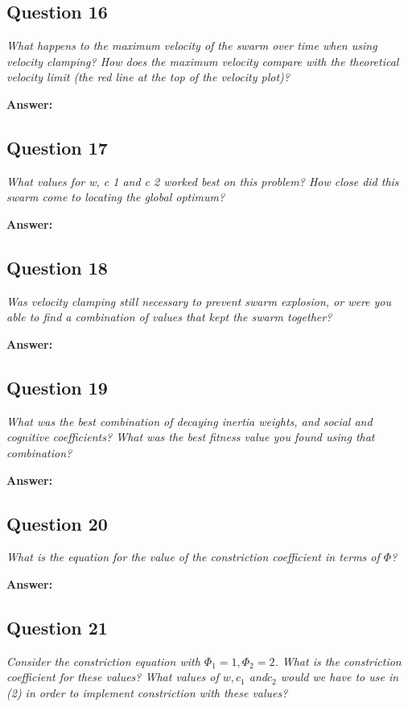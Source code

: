 \documentclass[a4paper]{article}
\begin{document}
\subsection*{Question 16}
\emph{What happens to the maximum velocity of the swarm over time
when using velocity clamping? How does the maximum velocity compare with
the theoretical velocity limit (the red line at the top of the velocity plot)?} 

\textbf{Answer:}

\subsection*{Question 17}
\emph{What values for w, c 1 and c 2 worked best on this problem? How
close did this swarm come to locating the global optimum?} 

\textbf{Answer:}

\subsection*{Question 18}
\emph{Was velocity clamping still necessary to prevent swarm explosion, or were you able to find a combination of values that kept the swarm together?} 

\textbf{Answer:}

\subsection*{Question 19}
\emph{What was the best combination of decaying inertia weights, and social and cognitive coefficients? What was the best fitness value you found using that combination?}

\textbf{Answer:}

\subsection*{Question 20}
\emph{What is the equation for the value of the constriction coefficient
in terms of $\Phi$?}

\textbf{Answer:}

\subsection*{Question 21}
\emph{Consider the constriction equation with $\Phi_1 = 1, \Phi_2 = 2$. What is the constriction coefficient for these values? What values of $w, c_1$ and$c_2$ would we have to use in (2) in order to implement constriction with these values?}
\end{document}
